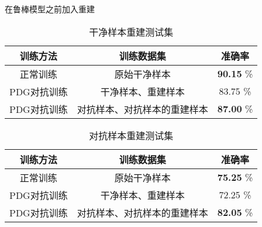 \begin{frame}{在鲁棒模型之前加入重建}
    \begin{table}[]
        \begin{center}
            \caption{干净样本重建测试集}
            \begin{tabular}{cc|c}
                \textbf{训练方法} & \textbf{训练数据集} & \textbf{准确率} \\
                \hline
                正常训练    & 原始干净样本                & \textbf{90.15} \% \\
                PDG对抗训练 & 干净样本、重建样本          & 83.75 \% \\
                PDG对抗训练 & 对抗样本、对抗样本的重建样本 & \textbf{87.00} \% \\
            \end{tabular}
        \end{center}
    \end{table}
    
    \begin{table}[]
        \begin{center}
            \caption{对抗样本重建测试集}
            \begin{tabular}{cc|c}
                \textbf{训练方法} & \textbf{训练数据集} & \textbf{准确率} \\
                \hline
                正常训练    & 原始干净样本                & \textbf{75.25} \% \\
                PDG对抗训练 & 干净样本、重建样本          & 72.25 \% \\
                PDG对抗训练 & 对抗样本、对抗样本的重建样本 & \textbf{82.05} \% \\
            \end{tabular}
        \end{center}
    \end{table}    
\end{frame}
